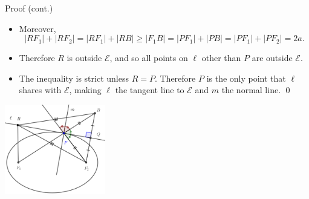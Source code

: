 \documentclass[compress,aspectratio=169,10pt,usenames,dvipsnames]{beamer}
\begin{document}
\begin{frame}

\vfill

\begin{block}{Proof (cont.)}
\begin{itemize}
\item Moreover,
$$
|RF_1| + |RF_2| = |RF_1| + |RB| \geq |F_1B| = |PF_1| + |PB| = |PF_1| + |PF_2| = 2a.
$$
\item Therefore $R$ is outside $\mathcal{E}$, and so all points on $\ell$ other than $P$ are outside $\mathcal{E}$. 
\item The inequality is strict unless $R=P$. Therefore $P$ is the only point that $\ell$ shares with $\mathcal{E}$, making $\ell$ the tangent line to $\mathcal{E}$ and $m$ the normal line. \qed
%
\end{itemize}
\end{block}

\begin{center}
\includegraphics[width=0.33\textwidth]{EllipseProp1D}
\end{center}

\vfill

\end{frame}

\end{document}
